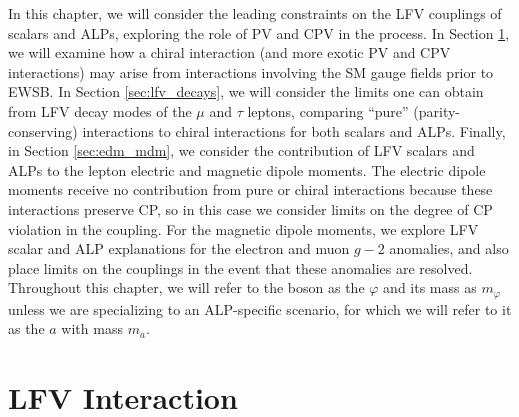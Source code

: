 In this chapter, we will consider the leading constraints on the LFV couplings of scalars and ALPs, exploring the role of PV and CPV in the process. In Section \ref{sec:lfv_int}, we will examine how a chiral interaction (and more exotic PV and CPV interactions) may arise from interactions involving the SM gauge fields prior to EWSB. In Section \ref{sec:lfv_decays}, we will consider the limits one can obtain from LFV decay modes of the $\mu$ and $\tau$ leptons, comparing ``pure'' (parity-conserving) interactions to chiral interactions for both scalars and ALPs. Finally, in Section \ref{sec:edm_mdm}, we consider the contribution of LFV scalars and ALPs to the lepton electric and magnetic dipole moments. The electric dipole moments receive no contribution from pure or chiral interactions because these interactions preserve CP, so in this case we consider limits on the degree of CP violation in the coupling. For the magnetic dipole moments, we explore LFV scalar and ALP explanations for the electron and muon $g-2$ anomalies, and also place limits on the couplings in the event that these anomalies are resolved. Throughout this chapter, we will refer to the boson as the $\varphi$ and its mass as $m_\varphi$ unless we are specializing to an ALP-specific scenario, for which we will refer to it as the $a$ with mass $m_a$.

\section{LFV Interaction}\label{sec:lfv_int}


